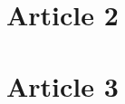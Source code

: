 \documentclass[
11pt, %
french, %
singlespacing, %
headsepline, %
]{MastersDoctoralThesis} %
\begin{document}
\chapter{Article 2}


\chapter{Article 3}










%
%

\end{document}
